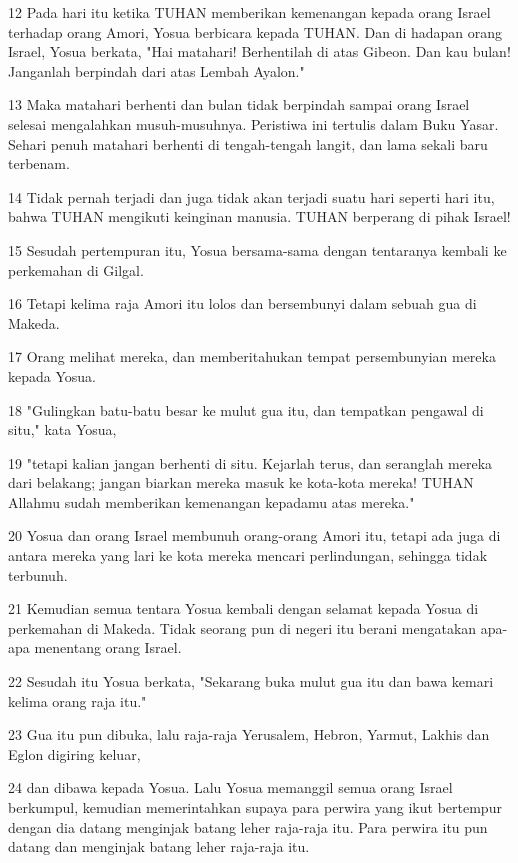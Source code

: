 \par 12 Pada hari itu ketika TUHAN memberikan kemenangan kepada orang Israel terhadap orang Amori, Yosua berbicara kepada TUHAN. Dan di hadapan orang Israel, Yosua berkata, "Hai matahari! Berhentilah di atas Gibeon. Dan kau bulan! Janganlah berpindah dari atas Lembah Ayalon."
\par 13 Maka matahari berhenti dan bulan tidak berpindah sampai orang Israel selesai mengalahkan musuh-musuhnya. Peristiwa ini tertulis dalam Buku Yasar. Sehari penuh matahari berhenti di tengah-tengah langit, dan lama sekali baru terbenam.
\par 14 Tidak pernah terjadi dan juga tidak akan terjadi suatu hari seperti hari itu, bahwa TUHAN mengikuti keinginan manusia. TUHAN berperang di pihak Israel!
\par 15 Sesudah pertempuran itu, Yosua bersama-sama dengan tentaranya kembali ke perkemahan di Gilgal.
\par 16 Tetapi kelima raja Amori itu lolos dan bersembunyi dalam sebuah gua di Makeda.
\par 17 Orang melihat mereka, dan memberitahukan tempat persembunyian mereka kepada Yosua.
\par 18 "Gulingkan batu-batu besar ke mulut gua itu, dan tempatkan pengawal di situ," kata Yosua,
\par 19 "tetapi kalian jangan berhenti di situ. Kejarlah terus, dan seranglah mereka dari belakang; jangan biarkan mereka masuk ke kota-kota mereka! TUHAN Allahmu sudah memberikan kemenangan kepadamu atas mereka."
\par 20 Yosua dan orang Israel membunuh orang-orang Amori itu, tetapi ada juga di antara mereka yang lari ke kota mereka mencari perlindungan, sehingga tidak terbunuh.
\par 21 Kemudian semua tentara Yosua kembali dengan selamat kepada Yosua di perkemahan di Makeda. Tidak seorang pun di negeri itu berani mengatakan apa-apa menentang orang Israel.
\par 22 Sesudah itu Yosua berkata, "Sekarang buka mulut gua itu dan bawa kemari kelima orang raja itu."
\par 23 Gua itu pun dibuka, lalu raja-raja Yerusalem, Hebron, Yarmut, Lakhis dan Eglon digiring keluar,
\par 24 dan dibawa kepada Yosua. Lalu Yosua memanggil semua orang Israel berkumpul, kemudian memerintahkan supaya para perwira yang ikut bertempur dengan dia datang menginjak batang leher raja-raja itu. Para perwira itu pun datang dan menginjak batang leher raja-raja itu.
